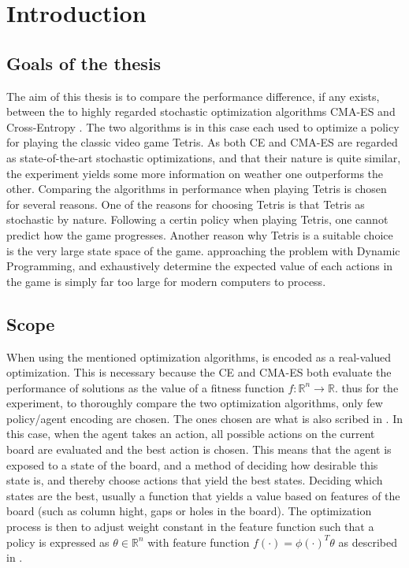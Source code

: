 \section{Introduction}

\subsection{Goals of the thesis}

The aim of this thesis is to compare the performance 
difference, if any exists, between the to highly regarded 
stochastic optimization algorithms CMA-ES \citep{hansen2011} and Cross-Entropy
\citep{cetut2014}.
The two algorithms is in this case each used to optimize 
a policy for playing the classic video game Tetris. As both CE and
CMA-ES are regarded as state-of-the-art stochastic optimizations, and that
their nature is quite similar, the experiment yields some more information
on weather one outperforms the other. Comparing the algorithms in performance
when playing Tetris is chosen for several reasons. One of the reasons for 
choosing Tetris is that Tetris as stochastic by nature. Following a certin 
policy when playing Tetris, one cannot predict how the game progresses. Another
reason why Tetris is a suitable choice is the very large state space of the game.
approaching the problem with Dynamic Programming, and exhaustively 
determine the expected value of each actions in the game is simply far too
large for modern computers to process.



\subsection{Scope\label{section:scope}}


When using the mentioned optimization algorithms,
is encoded as a real-valued optimization. This is necessary
because the CE and CMA-ES both evaluate the performance of solutions
as the value of a fitness function $f : \mathbb{R}^n \rightarrow \mathbb{R}$.
thus for the experiment, to thoroughly compare the two optimization algorithms,
only few policy/agent encoding are chosen. The ones chosen are
what is also scribed in \citep{scherrer2015}. In this case, 
when the agent takes an action, all possible actions on the current 
board are evaluated and the best action is chosen. This means that the agent 
is exposed to a state of the board, and a method of deciding how desirable 
this state is, and thereby choose actions that yield the best states. 
Deciding which states are the best, usually a function 
that yields a value based on features of the board 
(such as column hight, gaps or holes in the board). The optimization process
is then to adjust weight constant in the feature function such that 
a policy is expressed as $\theta \in \mathbb{R}^n$ with feature 
function $ f( \cdot ) = \phi ( \cdot )^{T}\theta$ as
described in \citep{scherrer2015}.\\

